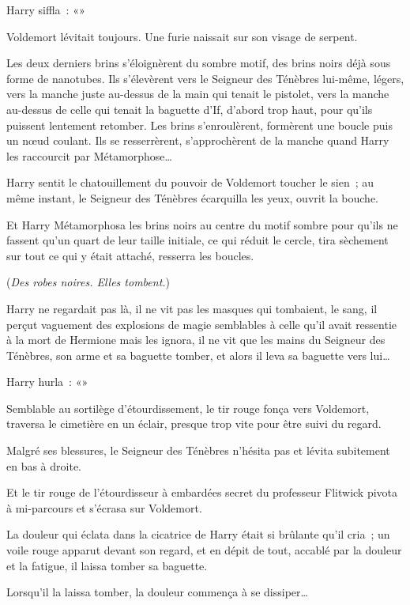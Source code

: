 Harry siffla~: «»

Voldemort lévitait toujours. Une furie naissait sur son visage de serpent.

Les deux derniers brins s'éloignèrent du sombre motif, des brins noirs déjà sous forme de nanotubes. Ils s'élevèrent vers le Seigneur des Ténèbres lui-même, légers, vers la manche juste au-dessus de la main qui tenait le pistolet, vers la manche au-dessus de celle qui tenait la baguette d'If, d'abord trop haut, pour qu'ils puissent lentement retomber. Les brins s'enroulèrent, formèrent une boucle puis un nœud coulant. Ils se resserrèrent, s'approchèrent de la manche quand Harry les raccourcit par Métamorphose…

Harry sentit le chatouillement du pouvoir de Voldemort toucher le sien~; au même instant, le Seigneur des Ténèbres écarquilla les yeux, ouvrit la bouche.

Et Harry Métamorphosa les brins noirs au centre du motif sombre pour qu'ils ne fassent qu'un quart de leur taille initiale, ce qui réduit le cercle, tira sèchement sur tout ce qui y était attaché, resserra les boucles.

(\emph{Des robes noires. Elles tombent.})

Harry ne regardait pas là, il ne vit pas les masques qui tombaient, le sang, il perçut vaguement des explosions de magie semblables à celle qu'il avait ressentie à la mort de Hermione mais les ignora, il ne vit que les mains du Seigneur des Ténèbres, son arme et sa baguette tomber, et alors il leva sa baguette vers lui…

Harry hurla~: «»

Semblable au sortilège d'étourdissement, le tir rouge fonça vers Voldemort, traversa le cimetière en un éclair, presque trop vite pour être suivi du regard.

Malgré ses blessures, le Seigneur des Ténèbres n'hésita pas et lévita subitement en bas à droite.

Et le tir rouge de l'étourdisseur à embardées secret du professeur Flitwick pivota à mi-parcours et s'écrasa sur Voldemort.

La douleur qui éclata dans la cicatrice de Harry était si brûlante qu'il cria~; un voile rouge apparut devant son regard, et en dépit de tout, accablé par la douleur et la fatigue, il laissa tomber sa baguette.

Lorsqu'il la laissa tomber, la douleur commença à se dissiper… 

